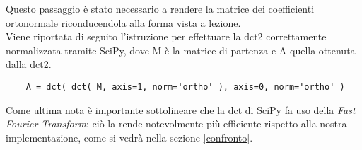 Questo passaggio è stato necessario a rendere la matrice dei coefficienti ortonormale riconducendola alla forma vista a lezione.\\
Viene riportata di seguito l'istruzione per effettuare la dct2 correttamente normalizzata tramite SciPy, dove M è la matrice di partenza e A quella ottenuta dalla dct2.
\begin{verbatim}
    A = dct( dct( M, axis=1, norm='ortho' ), axis=0, norm='ortho' )
\end{verbatim}
Come ultima nota è importante sottolineare che la dct di SciPy fa uso della \emph{Fast Fourier Transform}; ciò la rende notevolmente più efficiente rispetto alla nostra implementazione, come si vedrà nella sezione \ref{confronto}.
